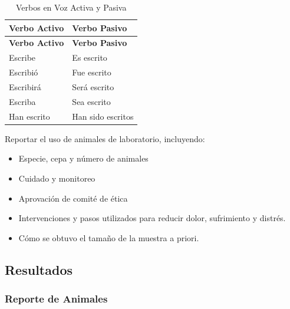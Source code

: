 \documentclass[
]{article}
\providecommand{\tightlist}{%
  \setlength{\itemsep}{0pt}\setlength{\parskip}{0pt}}\usepackage{longtable,booktabs,array}
\begin{document}
\begin{tcolorbox}
\begin{longtable}[]{@{}ll@{}}
\caption{Verbos en Voz Activa y Pasiva}\label{tbl-verbos}\tabularnewline
\toprule\noalign{}
\textbf{Verbo Activo} & \textbf{Verbo Pasivo} \\
\midrule\noalign{}
\endfirsthead
\toprule\noalign{}
\textbf{Verbo Activo} & \textbf{Verbo Pasivo} \\
\midrule\noalign{}
\endhead
\bottomrule\noalign{}
\endlastfoot
Escribe & Es escrito \\
Escribió & Fue escrito \\
Escribirá & Será escrito \\
Escriba & Sea escrito \\
Han escrito & Han sido escritos \\
\end{longtable}

\end{tcolorbox}

\begin{tcolorbox}[enhanced jigsaw, leftrule=.75mm, toprule=.15mm, colbacktitle=quarto-callout-tip-color!10!white, arc=.35mm, titlerule=0mm, coltitle=black, breakable, toptitle=1mm, bottomtitle=1mm, left=2mm, title=\textcolor{quarto-callout-tip-color}{\faLightbulb}\hspace{0.5em}{Animales de Laboratorio}, colframe=quarto-callout-tip-color-frame, rightrule=.15mm, bottomrule=.15mm, opacitybacktitle=0.6, opacityback=0, colback=white]

Reportar el uso de animales de laboratorio, incluyendo:

\begin{itemize}
\tightlist
\item
  Especie, cepa y número de animales
\item
  Cuidado y monitoreo
\item
  Aprovación de comité de ética
\item
  Intervenciones y pasos utilizados para reducir dolor, sufrimiento y
  distrés.
\item
  Cómo se obtuvo el tamaño de la muestra a priori.
\end{itemize}

\end{tcolorbox}

\subsection{Resultados}\label{resultados}

\subsubsection{Reporte de Animales}\label{reporte-de-animales}
\end{document}
